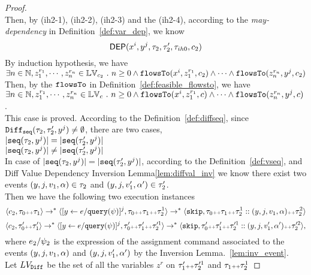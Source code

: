 \begin{proof}
\\
Then, by (ih2-1), (ih2-2), (ih2-3) and the (ih2-4), 
according to the \emph{may-dependency} in Definition~\ref{def:var_dep}, we know
\[
  \mathsf{DEP}(x^i, y^j, \mathtt{\tau}_2, \mathtt{\tau}_2', \mathtt{\tau}_{ih0}, c_2)
\] 
%
By induction hypothesis, we have 
\\
$\exists n \in \mathbb{N}, z_1^{r_1}, \cdots, z_n^{r_n} \in \mathbb{LV}_{{c_2}} ~.~ n \geq 0 \land
\mathtt{flowsTo}(x^i,  z_1^{r_1}, c_2) 
\land \cdots \land \mathtt{flowsTo}(z_n^{r_n}, y^j, c_2)$
\\
Then, by the $\mathtt{flowsTo}$ in Definition~\ref{def:feasible_flowsto}, we have 
\\
$\exists n \in \mathbb{N}, z_1^{r_1}, \cdots, z_n^{r_n} \in \mathbb{LV}_{{c}} ~.~ n \geq 0 \land
\mathtt{flowsTo}(x^i,  z_1^{r_1}, c) 
\land \cdots \land \mathtt{flowsTo}(z_n^{r_n}, y^j, c)$.
\\
This case is proved.
%
According to the Definition~\ref{def:diffseq}, since $\mathtt{Diff}_{\mathtt{seq}}(\mathtt{\tau}_2, \mathtt{\tau}_2', y^j) \neq \emptyset$, there are
two cases,
\\
$|\mathtt{seq}(\mathtt{\tau}_2, y^j)| = |\mathtt{seq}(\mathtt{\tau}_2', y^j)|$
\\
$|\mathtt{seq}(\mathtt{\tau}_2, y^j)| \neq |\mathtt{seq}(\mathtt{\tau}_2', y^j)|$
\\
In case of $|\mathtt{seq}(\mathtt{\tau}_2, y^j)| = |\mathtt{seq}(\mathtt{\tau}_2', y^j)|$, according to the Definition~\ref{def:vseq},
and {Diff Value Dependency Inversion Lemma\ref{lem:diffval_inv}} we know 
there exist two events $(y, j, v_1, \alpha) \in \mathtt{\tau}_2$ and $(y, j, v_1', \alpha') \in \mathtt{\tau}_2'$.
\\
Then we have the following two execution instances 
\\
\[
\langle c_2, \mathtt{\tau}_0 {\scriptscriptstyle ++} \mathtt{\tau}_1 \rangle \rightarrow^{*} \langle [\mathrel{ y \leftarrow e / {\tt query}(\psi) }]{}^{j}, \mathtt{\tau}_0 {\scriptscriptstyle ++} \mathtt{\tau}_1 {\scriptscriptstyle ++} \mathtt{\tau}_2^1 \rangle 
\rightarrow^* \langle \mathtt{skip}, \mathtt{\tau}_0 {\scriptscriptstyle ++} \mathtt{\tau}_1 {\scriptscriptstyle ++} \mathtt{\tau}_2^1 ::(y, j, v_1, \alpha) {\scriptscriptstyle ++} \mathtt{\tau}_2^2 \rangle  
\]
%
\[
\langle c_2, \mathtt{\tau}_0' {\scriptscriptstyle ++} \mathtt{\tau}_1' \rangle \rightarrow^{*} \langle [\mathrel{ y \leftarrow e / {\tt query}(\psi) }]{}^{j}, \mathtt{\tau}_0' {\scriptscriptstyle ++} \mathtt{\tau}_1' {\scriptscriptstyle ++} \mathtt{\tau}'^1_2 \rangle 
\rightarrow^* \langle \mathtt{skip}, \mathtt{\tau}_0' {\scriptscriptstyle ++} \mathtt{\tau}_1' {\scriptscriptstyle ++} \mathtt{\tau}'^1_2 ::(y, j, v_1', \alpha') {\scriptscriptstyle ++} \mathtt{\tau}'^2_2 \rangle,
\]
where $e_2 / \psi_2$ is the expression of the assignment command associated to the events $(y, j, v_1, \alpha)$ and $(y, j, v_1', \alpha')$ by the Inversion Lemma.~\ref{lem:inv_event}.
\\
Let $LV_{\mathtt{Diff}}$ be the set of all the variables $z^r$ on $\mathtt{\tau}_1' {\scriptscriptstyle ++} \mathtt{\tau}'^1_2$ and $\mathtt{\tau}_1 {\scriptscriptstyle ++} \mathtt{\tau}_2^1$ 

\end{proof}
